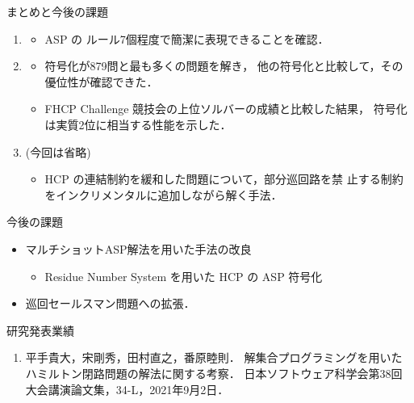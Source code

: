 \documentclass[dvipdfmx]{beamer}
\begin{document}
\begin{frame}{まとめと今後の課題}

\begin{enumerate}
\item {}
  \begin{itemize}
  \item ASP の \alert{ルール7個}程度で簡潔に表現できることを確認．
  \end{itemize}
\item {}
  \begin{itemize}
  \item {} 符号化が879問と最も多くの問題を解き，
    他の符号化と比較して，その優位性が確認できた．
  \item FHCP Challenge 競技会の上位ソルバーの成績と比較した結果，
     符号化は\alert{実質2位}に相当する性能を示した．
  \end{itemize}
\item {} (今回は省略)
  \begin{itemize}
   \item HCP の連結制約を緩和した問題について，部分巡回路を禁
         止する制約をインクリメンタルに追加しながら解く手法．
  \end{itemize}
\end{enumerate}

\begin{block}{今後の課題}
  \begin{itemize}
  \item マルチショットASP解法を用いた手法の改良
    \begin{itemize}
    \item Residue Number System を用いた
      HCP の ASP 符号化
    \end{itemize}
  \item 巡回セールスマン問題への拡張．
  \end{itemize}
\end{block}
\end{frame}

\begin{frame}{研究発表業績}
  \begin{enumerate}
  \item 平手貴大，宋剛秀，田村直之，番原睦則．
    解集合プログラミングを用いたハミルトン閉路問題の解法に関する考察．
    日本ソフトウェア科学会第38回大会講演論文集，34-L，2021年9月2日．
  \end{enumerate}
\end{frame}
\end{document}
